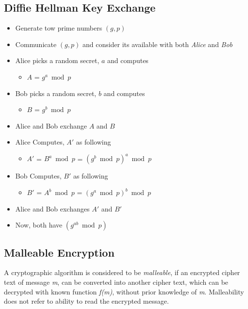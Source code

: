 \documentclass[12pt]{article}
\begin{document}
\subsection{Diffie Hellman Key Exchange}
\begin{itemize}
\item Generate tow prime numbers $(g,p)$
\item Communicate $(g,p)$ and consider its available with both \textit{Alice} and \textit{Bob}

\item Alice picks a random secret, $a$ and computes
\begin{itemize}
\item $A$ = $g^a \bmod p$
\end{itemize}

\item Bob picks a random secret, $b$ and computes
\begin{itemize}
\item $B$ = $g^b \bmod p$
\end{itemize}

\item Alice and Bob exchange $A$ and $B$

\item Alice Computes, $A'$ as following
\begin{itemize}
\item $A'$ = $B^a \bmod p$ = $(g^b \bmod p)^a \bmod p$
\end{itemize}

\item Bob Computes, $B'$ as following
\begin{itemize}
\item $B'$ = $A^b \bmod p$ = $(g^a \bmod p)^b \bmod p$
\end{itemize}

\item Alice and Bob exchanges $A'$ and $B'$
\item Now, both have $(g^{ab} \bmod p)$
\end{itemize}


\pagebreak
\vspace*{\fill}
\begin{center}
\section{Malleable Encryption}
A cryptographic algorithm is considered to be \textit{malleable}, if an encrypted cipher text of message \textit{m}, 
can be converted into another cipher text, which can be decrypted with known function \textit{f(m)}, without 
prior knowledge of \textit{m}. Malleability does not refer to ability to read the encrypted message. \\
\end{center}
\vspace*{\fill}
\pagebreak
\end{document}
